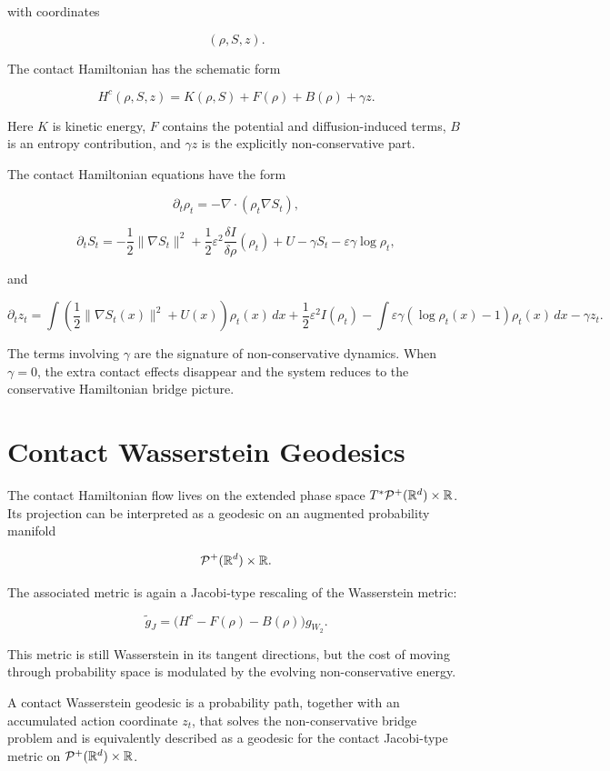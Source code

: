 with coordinates

\[
(\rho,S,z).
\]

The contact Hamiltonian has the schematic form

\[
H^c(\rho,S,z)
=
K(\rho,S)+F(\rho)+B(\rho)+\gamma z.
\]

Here $K$ is kinetic energy, $F$ contains the potential and diffusion-induced
terms, $B$ is an entropy contribution, and $\gamma z$ is the explicitly
non-conservative part.

The contact Hamiltonian equations have the form

\[
\partial_t\rho_t
=
-\nabla\cdot(\rho_t\nabla S_t),
\]

\[
\partial_t S_t
=
-\frac12\|\nabla S_t\|^2
+\frac12\varepsilon^2
\frac{\delta I}{\delta\rho}(\rho_t)
+U
-\gamma S_t
-\varepsilon\gamma\log\rho_t,
\]

and

\[
\partial_t z_t
=
\int
\left(
\frac12\|\nabla S_t(x)\|^2+U(x)
\right)
\rho_t(x)\,dx
+\frac12\varepsilon^2 I(\rho_t)
-\int
\varepsilon\gamma(\log\rho_t(x)-1)\rho_t(x)\,dx
-\gamma z_t.
\]

\begin{remark}
The terms involving $\gamma$ are the signature of non-conservative dynamics.
When $\gamma=0$, the extra contact effects disappear and the system reduces
to the conservative Hamiltonian bridge picture.
\end{remark}

\section{Contact Wasserstein Geodesics}

The contact Hamiltonian flow lives on the extended phase space
$T^*\mathcal{P}^+(\mathbb{R}^d)\times\mathbb{R}$. Its projection can be interpreted as a geodesic on an
augmented probability manifold

\[
\mathcal{P}^+(\mathbb{R}^d)\times\mathbb{R}.
\]

The associated metric is again a Jacobi-type rescaling of the Wasserstein
metric:

\[
\widetilde g_J
=
\bigl(H^c-F(\rho)-B(\rho)\bigr)g_{W_2}.
\]

This metric is still Wasserstein in its tangent directions, but the cost of
moving through probability space is modulated by the evolving
non-conservative energy.

\begin{definition}
A contact Wasserstein geodesic is a probability path, together with an
accumulated action coordinate $z_t$, that solves the non-conservative bridge
problem and is equivalently described as a geodesic for the contact
Jacobi-type metric on $\mathcal{P}^+(\mathbb{R}^d)\times\mathbb{R}$.
\end{definition}

